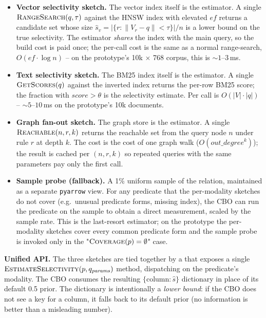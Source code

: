 \documentclass[sigconf,nonacm,review]{acmart}
\theoremstyle{plain}
\theoremstyle{definition}
\theoremstyle{remark}
\begin{document}
\begin{itemize}[leftmargin=*]
  \item \textbf{Vector selectivity sketch.} The vector index itself
    is the estimator. A single $\Call{RangeSearch}{q, \tau}$
    against the HNSW index with elevated
    $\mathit{ef}$ returns a candidate set whose size
    $\hat{s}_v = |\{r : \|V_r - q\| < \tau\}| / n$ is a
    lower bound on the true selectivity. The estimator \emph{shares}
    the index with the main query, so the build cost is paid
    once; the per-call cost is the same as a normal
    range-search, $O(\mathit{ef} \cdot \log n)$ -- on the
    prototype's 10k $\times$ 768 corpus, this is
    $\sim 1$--$3$\,ms.

  \item \textbf{Text selectivity sketch.} The BM25 index itself is
    the estimator. A single $\Call{GetScores}{q}$ against the
    inverted index returns the per-row BM25 score; the fraction
    with $\mathit{score} > \theta$ is the selectivity estimate. Per
    call is $O(|V| \cdot |q|)$ -- $\sim 5$--$10$\,ms on the
    prototype's 10k documents.

  \item \textbf{Graph fan-out sketch.} The graph store is the
    estimator. A single $\Call{Reachable}{n, r, k}$ returns the
    reachable set from the query node $n$ under rule $r$ at depth
    $k$. The cost is the cost of one graph walk
    ($O(\mathit{out\_degree}^k)$); the result is cached per
    $(n, r, k)$ so repeated queries with the same parameters pay
    only the first call.

  \item \textbf{Sample probe (fallback).} A 1\% uniform sample of
    the relation, maintained as a separate \texttt{pyarrow} view.
    For any predicate that the per-modality sketches do not cover
    (e.g.\ unusual predicate forms, missing index), the CBO can
    run the predicate on the sample to obtain a direct
    measurement, scaled by the sample rate. This is the
    last-resort estimator; on the prototype the per-modality
    sketches cover every common predicate form and the sample
    probe is invoked only in the
    "$\Call{Coverage}{p} = \emptyset$" case.
\end{itemize}

\noindent\textbf{Unified API.} The three sketches are tied together
by a  that exposes a single
$\Call{EstimateSelectivity}{p, q_{\mathit{params}}}$ method,
dispatching on the predicate's modality. The CBO consumes the resulting
$\{ \text{column}: \hat{s} \}$ dictionary in place of its default
0.5 prior. The dictionary is intentionally a \emph{lower bound}: if
the CBO does not see a key for a column, it falls back to its
default prior (no information is better than a misleading number).
\end{document}
